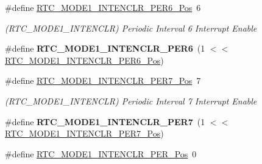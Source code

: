 \begin{DoxyCompactItemize}
\item 
\hypertarget{group___s_a_m_l21___r_t_c_ga28ff9c71266100d1e4a439798cb66e3c}{}\#define \hyperlink{group___s_a_m_l21___r_t_c_ga28ff9c71266100d1e4a439798cb66e3c}{R\+T\+C\+\_\+\+M\+O\+D\+E1\+\_\+\+I\+N\+T\+E\+N\+C\+L\+R\+\_\+\+P\+E\+R6\+\_\+\+Pos}~6\label{group___s_a_m_l21___r_t_c_ga28ff9c71266100d1e4a439798cb66e3c}

\begin{DoxyCompactList}\small\item\em (R\+T\+C\+\_\+\+M\+O\+D\+E1\+\_\+\+I\+N\+T\+E\+N\+C\+L\+R) Periodic Interval 6 Interrupt Enable \end{DoxyCompactList}\item 
\hypertarget{group___s_a_m_l21___r_t_c_ga37000628abe41991b0722939c498b914}{}\#define {\bfseries R\+T\+C\+\_\+\+M\+O\+D\+E1\+\_\+\+I\+N\+T\+E\+N\+C\+L\+R\+\_\+\+P\+E\+R6}~(1 $<$$<$ \hyperlink{group___s_a_m_l21___r_t_c_ga28ff9c71266100d1e4a439798cb66e3c}{R\+T\+C\+\_\+\+M\+O\+D\+E1\+\_\+\+I\+N\+T\+E\+N\+C\+L\+R\+\_\+\+P\+E\+R6\+\_\+\+Pos})\label{group___s_a_m_l21___r_t_c_ga37000628abe41991b0722939c498b914}

\item 
\hypertarget{group___s_a_m_l21___r_t_c_gae6b60566e0f428ea586fa0bd3183da2c}{}\#define \hyperlink{group___s_a_m_l21___r_t_c_gae6b60566e0f428ea586fa0bd3183da2c}{R\+T\+C\+\_\+\+M\+O\+D\+E1\+\_\+\+I\+N\+T\+E\+N\+C\+L\+R\+\_\+\+P\+E\+R7\+\_\+\+Pos}~7\label{group___s_a_m_l21___r_t_c_gae6b60566e0f428ea586fa0bd3183da2c}

\begin{DoxyCompactList}\small\item\em (R\+T\+C\+\_\+\+M\+O\+D\+E1\+\_\+\+I\+N\+T\+E\+N\+C\+L\+R) Periodic Interval 7 Interrupt Enable \end{DoxyCompactList}\item 
\hypertarget{group___s_a_m_l21___r_t_c_ga874e7e246306cb98ac3d967f2a07495a}{}\#define {\bfseries R\+T\+C\+\_\+\+M\+O\+D\+E1\+\_\+\+I\+N\+T\+E\+N\+C\+L\+R\+\_\+\+P\+E\+R7}~(1 $<$$<$ \hyperlink{group___s_a_m_l21___r_t_c_gae6b60566e0f428ea586fa0bd3183da2c}{R\+T\+C\+\_\+\+M\+O\+D\+E1\+\_\+\+I\+N\+T\+E\+N\+C\+L\+R\+\_\+\+P\+E\+R7\+\_\+\+Pos})\label{group___s_a_m_l21___r_t_c_ga874e7e246306cb98ac3d967f2a07495a}

\item 
\hypertarget{group___s_a_m_l21___r_t_c_ga66bb2890c901fec94231d66775778264}{}\#define \hyperlink{group___s_a_m_l21___r_t_c_ga66bb2890c901fec94231d66775778264}{R\+T\+C\+\_\+\+M\+O\+D\+E1\+\_\+\+I\+N\+T\+E\+N\+C\+L\+R\+\_\+\+P\+E\+R\+\_\+\+Pos}~0\label{group___s_a_m_l21___r_t_c_ga66bb2890c901fec94231d66775778264}


\end{DoxyCompactItemize}
